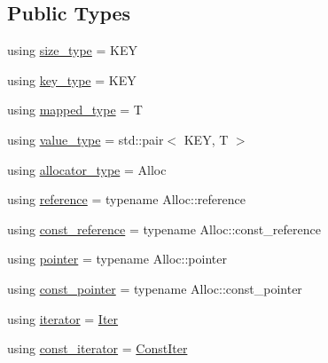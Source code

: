 \subsection*{Public Types}
\begin{DoxyCompactItemize}
\item 
using \hyperlink{classtheoria_1_1util_1_1densemap_a133075e61db44e086c734c8a32ca6ab2}{size\+\_\+type} = K\+EY
\item 
using \hyperlink{classtheoria_1_1util_1_1densemap_afd285a46dc8f45b4b1556a656708d2a7}{key\+\_\+type} = K\+EY
\item 
using \hyperlink{classtheoria_1_1util_1_1densemap_a8c1e5a57a1e76089bd675da3fa3347d8}{mapped\+\_\+type} = T
\item 
using \hyperlink{classtheoria_1_1util_1_1densemap_a6d2419665695def56b2abbd849f74b08}{value\+\_\+type} = std\+::pair$<$ K\+EY, T $>$
\item 
using \hyperlink{classtheoria_1_1util_1_1densemap_ae12f4688e504c8759e23759ad7272c94}{allocator\+\_\+type} = Alloc
\item 
using \hyperlink{classtheoria_1_1util_1_1densemap_a20361bfcacef17947099d8580befbbdc}{reference} = typename Alloc\+::reference
\item 
using \hyperlink{classtheoria_1_1util_1_1densemap_a7a3dd11d6fd160c467c43d2029c3592a}{const\+\_\+reference} = typename Alloc\+::const\+\_\+reference
\item 
using \hyperlink{classtheoria_1_1util_1_1densemap_ae892a1fc35162971bb0278c7904995c6}{pointer} = typename Alloc\+::pointer
\item 
using \hyperlink{classtheoria_1_1util_1_1densemap_ab19ebc07bf788b5689adaa3a80b46c31}{const\+\_\+pointer} = typename Alloc\+::const\+\_\+pointer
\item 
using \hyperlink{classtheoria_1_1util_1_1densemap_a4ee170442110252d3033534246f9677f}{iterator} = \hyperlink{classtheoria_1_1util_1_1densemap_1_1Iter}{Iter}
\item 
using \hyperlink{classtheoria_1_1util_1_1densemap_a8c2937f8e4ba47abf344d9f9f23f0c88}{const\+\_\+iterator} = \hyperlink{classtheoria_1_1util_1_1densemap_1_1ConstIter}{Const\+Iter}
\end{DoxyCompactItemize}
